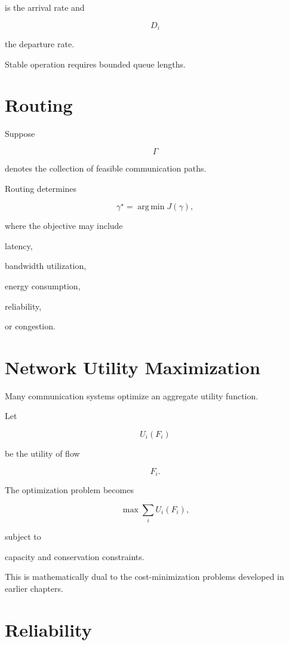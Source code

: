 \documentclass[11pt,fleqn]{book}
\numberwithin{equation}{chapter}
\theoremstyle{plain}
\theoremstyle{definition}
\theoremstyle{remark}
\begin{document}
is the arrival rate and

\[
D_i
\]

the departure rate.

Stable operation requires bounded queue lengths.


\section{Routing}

Suppose

\[
\Gamma
\]

denotes the collection of feasible communication paths.

Routing determines

\[
\gamma^\star
=
\operatorname*{arg\,min}
J(\gamma),
\]

where the objective may include

latency,

bandwidth utilization,

energy consumption,

reliability,

or congestion.


\section{Network Utility Maximization}

Many communication systems optimize an aggregate utility function.

Let

\[
U_i(F_i)
\]

be the utility of flow

\[
F_i.
\]

The optimization problem becomes

\[
\boxed{
\max
\sum_i
U_i(F_i),
}
\]

subject to

capacity and conservation constraints.

This is mathematically dual to the cost-minimization problems developed
in earlier chapters.


\section{Reliability}
\end{document}
